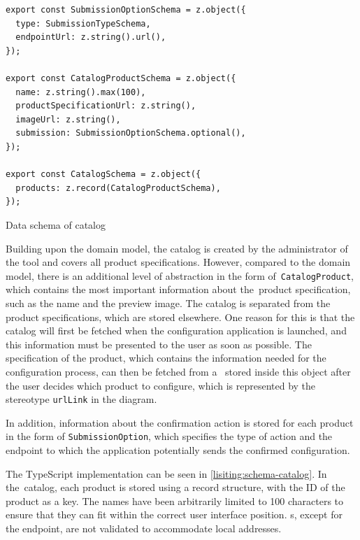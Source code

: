 \begin{listing}[h]
\begin{verbatim}
export const SubmissionOptionSchema = z.object({
  type: SubmissionTypeSchema,
  endpointUrl: z.string().url(),
});

export const CatalogProductSchema = z.object({
  name: z.string().max(100),
  productSpecificationUrl: z.string(),
  imageUrl: z.string(),
  submission: SubmissionOptionSchema.optional(),
});

export const CatalogSchema = z.object({
  products: z.record(CatalogProductSchema),
});
\end{verbatim}
\caption{Data schema of catalog}
\label{lisiting:schema-catalog}
\end{listing}

Building upon the domain model, the catalog is created by the administrator of the tool and covers all product specifications. However, compared to the domain model, there is an additional level of abstraction in the form of~\texttt{CatalogProduct}, which contains the most important information about the~product specification, such as the name and the preview image. The catalog is separated from the product specifications, which are stored elsewhere. One reason for this is that the catalog will first be fetched when the configuration application is launched, and this information must be presented to the user as soon as possible. The specification of the product, which contains the information needed for the configuration process, can then be fetched from a~ stored inside this object after the user decides which product to configure, which is represented by the stereotype \texttt{urlLink} in the  diagram.

In addition, information about the confirmation action is stored for each product in the form of \texttt{SubmissionOption}, which specifies the type of action and the endpoint to which the application potentially sends the confirmed configuration.

The TypeScript implementation can be seen in \autoref{lisiting:schema-catalog}. In the~catalog, each product is stored using a record structure, with the ID of the product as a key. The names have been arbitrarily limited to 100 characters to ensure that they can fit within the correct user interface position. s, except for the endpoint, are not validated to accommodate local addresses.


